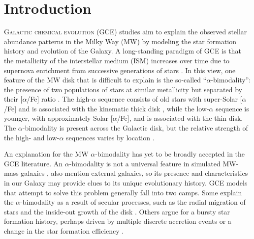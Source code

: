 \documentclass[twocolumn,twocolappendix,linenumbers]{aastex631}
\newcommand{\todo}[1]{{\color{red}#1}}
\newcommand{\aFe}{[$\alpha$/Fe]\xspace}
\begin{document}
\section{Introduction}

\lettrine{G}{alactic chemical evolution} (GCE) studies aim to explain the observed stellar abundance patterns in the Milky Way (MW) by modeling the star formation history and evolution of the Galaxy. A long-standing paradigm of GCE is that the metallicity of the interstellar medium (ISM) increases over time due to supernova enrichment from successive generations of stars \citep[e.g.,][]{tinsley_stellar_1979,matteucci_relative_1986}. In this view, one feature of the MW disk that is difficult to explain is the so-called ``$\alpha$-bimodality'': the presence of two populations of stars at similar metallicity but separated by their \aFe ratio \citep[e.g.,][]{bensby_exploring_2014}. The high-$\alpha$ sequence consists of old stars \citep[$\gtrsim9$ Gyr; e.g.,][]{pinsonneault_apokasc-3_2025} with super-Solar \aFe and is associated with the kinematic thick disk \citep[e.g.,][]{fuhrmann_nearby_1998}, while the low-$\alpha$ sequence is younger, with approximately Solar \aFe, and is associated with the thin disk. The $\alpha$-bimodality is present across the Galactic disk, but the relative strength of the high- and low-$\alpha$ sequences varies by location \citep{hayden_chemical_2015}. 

An explanation for the MW $\alpha$-bimodality has yet to be broadly accepted in the GCE literature. An $\alpha$-bimodality is not a universal feature in simulated MW-mass galaxies \citep[e.g.,][]{mackereth_origin_2018,parul_effect_2025}, \todo{also mention external galaxies}, so its presence and characteristics in our Galaxy may provide clues to its unique evolutionary history. GCE models that attempt to solve this problem generally fall into two camps. Some explain the $\alpha$-bimodality as a result of secular processes, such as the radial migration of stars and the inside-out growth of the disk \citep[e.g.,][]{kubryk_evolution_2015,sharma_chemical_2021,chen_chemical_2023,prantzos_origin_2023}. Others argue for a bursty star formation history, perhaps driven by multiple discrete accretion events \citep[e.g.,][]{chiappini_chemical_1997,mackereth_origin_2018,spitoni_beyond_2023} or a change in the star formation efficiency \citep[e.g.][]{conroy_birth_2022}.
\end{document}
